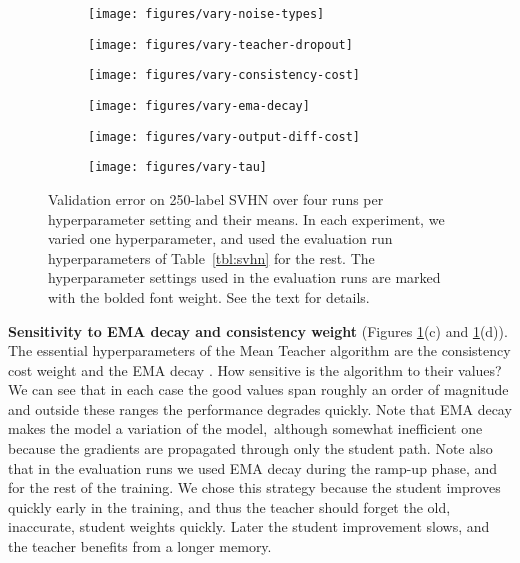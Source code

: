 \documentclass{article}
\begin{document}
\begin{figure}[t]
\centering

\begin{subfigure}[t]{0.31\linewidth}
\texttt{[image: figures/vary-noise-types]}
\end{subfigure}
\hfill
\begin{subfigure}[t]{0.31\linewidth}
\texttt{[image: figures/vary-teacher-dropout]}
\end{subfigure}
\hfill
\begin{subfigure}[t]{0.31\linewidth}
\texttt{[image: figures/vary-consistency-cost]}
\end{subfigure}

\begin{subfigure}[t]{0.31\linewidth}
\texttt{[image: figures/vary-ema-decay]}
\end{subfigure}
\hfill
\begin{subfigure}[t]{0.31\linewidth}
\texttt{[image: figures/vary-output-diff-cost]}
\end{subfigure}
\hfill
\begin{subfigure}[t]{0.31\linewidth}
\texttt{[image: figures/vary-tau]}
\end{subfigure}

\caption{Validation error on 250-label SVHN over four runs per hyperparameter setting and their means.
In each experiment, we varied one hyperparameter, and used the evaluation run hyperparameters of Table~\ref{tbl:svhn} for the rest.
The hyperparameter settings used in the evaluation runs are marked with the bolded font weight.
See the text for details.
}
\label{fig:variations}
\end{figure}

\textbf{Sensitivity to EMA decay and consistency weight}
(Figures \ref{fig:variations}(c) and \ref{fig:variations}(d)).
The essential hyperparameters of the Mean Teacher algorithm are the consistency cost weight and the EMA decay .
How sensitive is the algorithm to their values?
We can see that in each case the good values span roughly an order of magnitude and outside these ranges the performance degrades quickly.
Note that EMA decay  makes the model a variation of the  model, although somewhat inefficient one because the gradients are propagated through only the student path.
Note also that in the evaluation runs we used EMA decay  during the ramp-up phase, and  for the rest of the training.
We chose this strategy because the student improves quickly early in the training, and thus the teacher should forget the old, inaccurate, student weights quickly.
Later the student improvement slows, and the teacher benefits from a longer memory.
\end{document}
